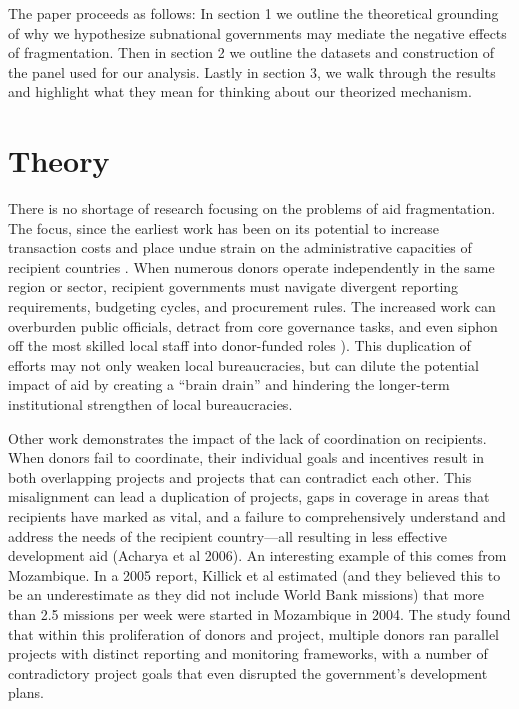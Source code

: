 \documentclass[11pt]{article}
\begin{document}
The paper proceeds as follows: In section 1 we outline the theoretical grounding of why we hypothesize subnational governments may mediate the negative effects of fragmentation. Then in section 2 we outline the datasets and construction of the panel used for our analysis. Lastly in section 3, we walk through the results and highlight what they mean for thinking about our theorized mechanism. 

\section{Theory}
There is no shortage of research focusing on the problems of aid fragmentation. The focus, since the earliest work has been on its potential to increase transaction costs and place undue strain on the administrative capacities of recipient countries \cite{knack_donor_2007}. When numerous donors operate independently in the same region or sector, recipient governments must navigate divergent reporting requirements, budgeting cycles, and procurement rules. The increased work can overburden public officials, detract from core governance tasks, and even siphon off the most skilled local staff into donor-funded roles \cite{knack_donor_2007}). This duplication of efforts may not only weaken local bureaucracies, but can dilute the potential impact of aid by creating a “brain drain” and hindering the longer-term institutional strengthen of local bureaucracies. 

Other work demonstrates the impact of the lack of coordination on recipients. When donors fail to coordinate, their individual goals and incentives result in both overlapping projects and projects that can contradict each other. This misalignment can lead a duplication of projects, gaps in coverage in areas that recipients have marked as vital, and a failure to comprehensively understand and address the needs of the recipient country—all resulting in less effective development aid (Acharya et al 2006). An interesting example of this comes from Mozambique. In a 2005 report, Killick et al estimated (and they believed this to be an underestimate as they did not include World Bank missions) that more than 2.5 missions per week were started in Mozambique in 2004. The study found that within this proliferation of donors and project, multiple donors ran parallel projects with distinct reporting and monitoring frameworks, with a number of contradictory project goals that even disrupted the government’s development plans.
\end{document}
